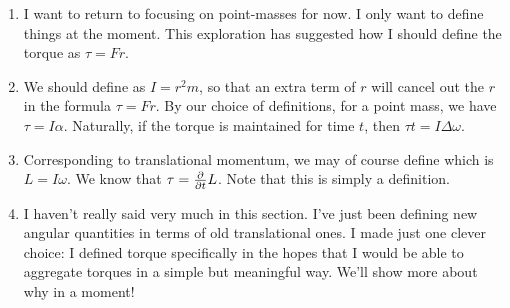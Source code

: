\begin{enumerate}
  \item I want to return to focusing on point-masses for now. I only
  want to define things at the moment. This exploration has suggested
  how I should define the torque as $\tau = Fr$.

  \item We should define  as $I = r^2 m$, so
  that an extra term of $r$ will cancel out the $r$ in the formula $\tau
  = F r$. By our choice of definitions, for a point mass, we have $\tau
  = I \alpha$. Naturally, if the torque is maintained for time $t$, then
  $\tau t = I \Delta \omega$.

  \item Corresponding to translational momentum, we may of course define
   which is $L = I \omega$. We know that $\tau
  = \frac{\partial }{\partial t} L$. Note that this is simply a definition.

  \item I haven't really said very much in this section. I've just been
  defining new angular quantities in terms of old translational ones. I
  made just one clever choice: I defined torque specifically in the
  hopes that I would be able to aggregate torques in a simple but
  meaningful way. We'll show more about why in a moment!
\end{enumerate}
